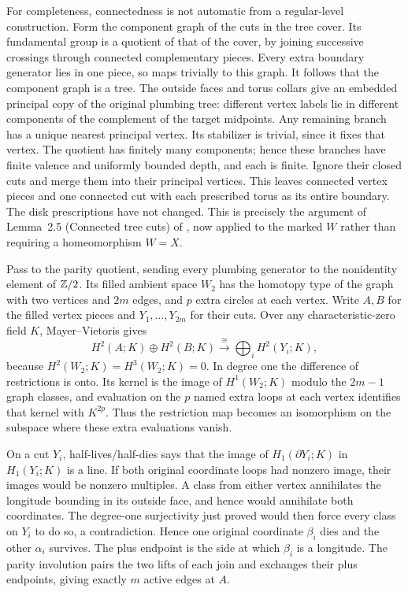 For completeness, connectedness is not automatic from a regular-level
construction.  Form the component graph of the cuts in the tree cover.
Its fundamental group is a quotient of that of the cover, by joining
successive crossings through connected complementary pieces.  Every
extra boundary generator lies in one piece, so maps trivially to this
graph.  It follows that the component graph is a tree.  The outside
faces and torus collars give an embedded principal copy of the original
plumbing tree: different vertex labels lie in different components of
the complement of the target midpoints.  Any remaining branch has a
unique nearest principal vertex.  Its stabilizer is trivial, since it
fixes that vertex.  The quotient has finitely many components; hence
these branches have finite valence and uniformly bounded depth, and
each is finite.  Ignore their closed cuts and merge them into their
principal vertices.  This leaves connected vertex pieces and one
connected cut with each prescribed torus as its entire boundary.
The disk prescriptions have not changed.  This is precisely the
argument of Lemma~2.5 (Connected tree cuts) of \cite{TO}, now
applied to the marked $W$ rather than requiring a homeomorphism $W=X$.

Pass to the parity quotient, sending every plumbing generator to the
nonidentity element of $\mathbb Z/2$.  Its filled ambient space $W_2$ has
the homotopy type of the graph with two vertices and $2m$ edges,
and $p$ extra circles at each vertex.  Write $A,B$ for the filled
vertex pieces and $Y_1,\ldots,Y_{2m}$ for their cuts.  Over any
characteristic-zero field $K$, Mayer--Vietoris gives
\begin{equation}
\label{ch:restriction-two}
 H^2(A;K)\oplus H^2(B;K)
       \xrightarrow{\ \cong\ }\bigoplus_iH^2(Y_i;K),
\end{equation}
because $H^2(W_2;K)=H^3(W_2;K)=0$.  In degree one the difference
of restrictions is onto.  Its kernel is the image of $H^1(W_2;K)$
modulo the $2m-1$ graph classes, and evaluation on the $p$ named
extra loops at each vertex identifies that kernel with $K^{2p}$.
Thus the restriction map becomes an isomorphism on the subspace
where these extra evaluations vanish.

On a cut $Y_i$, half-lives/half-dies says that the image of
$H_1(\partial Y_i;K)$ in $H_1(Y_i;K)$ is a line.  If both original
coordinate loops had nonzero image, their images would be nonzero
multiples.  A class from either vertex annihilates the longitude
bounding in its outside face, and hence would annihilate both
coordinates.  The degree-one surjectivity just proved would then
force every class on $Y_i$ to do so, a contradiction.  Hence one
original coordinate $\beta_i$ dies and the other $\alpha_i$ survives.
The plus endpoint is the side at which $\beta_i$ is a longitude.
The parity involution pairs the two lifts of each join and exchanges
their plus endpoints, giving exactly $m$ active edges at $A$.

